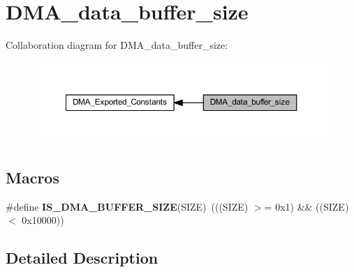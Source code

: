 \hypertarget{group___d_m_a__data__buffer__size}{}\section{D\+M\+A\+\_\+data\+\_\+buffer\+\_\+size}
\label{group___d_m_a__data__buffer__size}
Collaboration diagram for D\+M\+A\+\_\+data\+\_\+buffer\+\_\+size\+:\nopagebreak
\begin{figure}[H]
\begin{center}
\leavevmode
\includegraphics[width=350pt]{group___d_m_a__data__buffer__size}
\end{center}
\end{figure}
\subsection*{Macros}
\begin{DoxyCompactItemize}
\item 
\mbox{\label{group___d_m_a__data__buffer__size_ga72ef4033bb3bc2cdfdbe579083b05e32}} 
\#define {\bfseries I\+S\+\_\+\+D\+M\+A\+\_\+\+B\+U\+F\+F\+E\+R\+\_\+\+S\+I\+ZE}(S\+I\+ZE)~(((S\+I\+ZE) $>$= 0x1) \&\& ((\+S\+I\+Z\+E) $<$ 0x10000))
\end{DoxyCompactItemize}


\subsection{Detailed Description}
